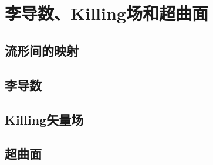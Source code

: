 \chapter[李导数、Killing场和超曲面]{\\李导数、Killing场和超曲面}

\section{流形间的映射}

\section{李导数}

\section{Killing矢量场}

\section{超曲面}
